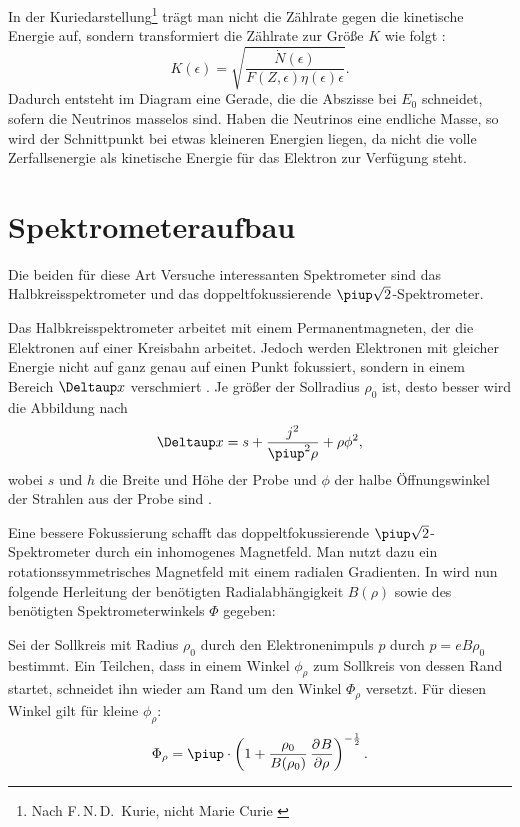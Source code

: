 In der Kuriedarstellung\footnote{Nach F.\,N.\,D\@.~Kurie, nicht Marie Curie
\parencite{wikipedia/Kurie}} trägt man nicht die Zählrate gegen die kinetische
Energie auf, sondern transformiert die Zählrate zur Größe $K$ wie folgt
\parencite[(138)]{Riezler/Kernphysikalisches}:
\[
    K(\epsilon) = \sqrt{\frac{\dot N(\epsilon)}{F(Z, \epsilon) \eta(\epsilon) \epsilon}}.
\]
Dadurch entsteht im Diagram eine Gerade, die die Abszisse bei $E_0$ schneidet,
sofern die Neutrinos masselos sind. Haben die Neutrinos eine endliche Masse, so
wird der Schnittpunkt bei etwas kleineren Energien liegen, da nicht die volle
Zerfallsenergie als kinetische Energie für das Elektron zur Verfügung steht.

\section{Spektrometeraufbau}

Die beiden für diese Art Versuche interessanten Spektrometer sind das
Halbkreisspektrometer und das doppeltfokussierende $\piup \sqrt
2$-Spektrometer.

Das Halbkreisspektrometer arbeitet mit einem Permanentmagneten, der die
Elektronen auf einer Kreisbahn arbeitet. Jedoch werden Elektronen mit gleicher
Energie nicht auf ganz genau auf einen Punkt fokussiert, sondern in einem
Bereich $\Deltaup x$ verschmiert
\parencite[§2.231]{Riezler/Kernphysikalisches}. Je größer der Sollradius
$\rho_0$ ist, desto besser wird die Abbildung nach 
\[
    \Deltaup x = s + \frac{j^2}{\piup^2 \rho} + \rho \phi^2,
\]
wobei $s$ und $h$ die Breite und Höhe der Probe und $\phi$ der halbe
Öffnungswinkel der Strahlen aus der Probe sind
\parencite[(123)]{Riezler/Kernphysikalisches}.

Eine bessere Fokussierung schafft das doppeltfokussierende $\piup \sqrt
2$-Spektrometer durch ein inhomogenes Magnetfeld. Man nutzt dazu
ein rotationssymmetrisches Magnetfeld mit einem radialen Gradienten. In
\parencite[§2.232]{Riezler/Kernphysikalisches} wird nun folgende Herleitung der
benötigten Radialabhängigkeit $B(\rho)$ sowie des benötigten
Spektrometerwinkels $\Phi$ gegeben:

Sei der Sollkreis mit Radius $\rho_0$ durch den Elektronenimpuls $p$ durch $p =
e B \rho_0$ bestimmt. Ein Teilchen, dass in einem Winkel $\phi_\rho$ zum
Sollkreis von dessen Rand startet, schneidet ihn wieder am Rand um den Winkel
$\Phi_\rho$ versetzt. Für diesen Winkel gilt für kleine $\phi_\rho$:
\parencite[(125)]{Riezler/Kernphysikalisches}
\[
    \Phi_\rho = \piup \cdot \del{1 + \frac{\rho_0}{B(\rho_0)} \dpd B
    \rho}^{-\frac 12}.
\]

